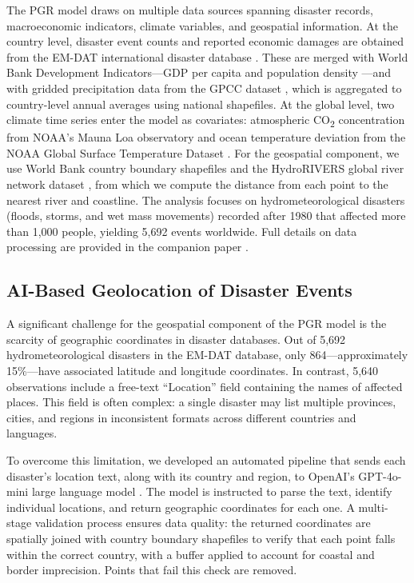 \documentclass[11pt,a4paper]{article}
\begin{document}
The PGR model draws on multiple data sources spanning disaster records, macroeconomic indicators, climate variables, and geospatial information. At the country level, disaster event counts and reported economic damages are obtained from the EM-DAT international disaster database \cite{emdat2024}. These are merged with World Bank Development Indicators---GDP per capita and population density \cite{worldbank_wdi_2024}---and with gridded precipitation data from the GPCC dataset \cite{gpcc_2022}, which is aggregated to country-level annual averages using national shapefiles. At the global level, two climate time series enter the model as covariates: atmospheric CO\textsubscript{2} concentration from NOAA's Mauna Loa observatory \cite{noaa_co2_2024} and ocean temperature deviation from the NOAA Global Surface Temperature Dataset \cite{zhang_noaa_2019}. For the geospatial component, we use World Bank country boundary shapefiles \cite{worldbank_wdi_2024} and the HydroRIVERS global river network dataset \cite{lehner2013}, from which we compute the distance from each point to the nearest river and coastline. The analysis focuses on hydrometeorological disasters (floods, storms, and wet mass movements) recorded after 1980 that affected more than 1,000 people, yielding 5,692 events worldwide. Full details on data processing are provided in the companion paper \cite{saldarriaga2026}.

\subsection{AI-Based Geolocation of Disaster Events}

A significant challenge for the geospatial component of the PGR model is the scarcity of geographic coordinates in disaster databases. Out of 5,692 hydrometeorological disasters in the EM-DAT database, only 864---approximately 15\%---have associated latitude and longitude coordinates. In contrast, 5,640 observations include a free-text ``Location'' field containing the names of affected places. This field is often complex: a single disaster may list multiple provinces, cities, and regions in inconsistent formats across different countries and languages.

To overcome this limitation, we developed an automated pipeline that sends each disaster's location text, along with its country and region, to OpenAI's GPT-4o-mini large language model \cite{openai2024gpt4omini}. The model is instructed to parse the text, identify individual locations, and return geographic coordinates for each one. A multi-stage validation process ensures data quality: the returned coordinates are spatially joined with country boundary shapefiles to verify that each point falls within the correct country, with a buffer applied to account for coastal and border imprecision. Points that fail this check are removed.
\end{document}
